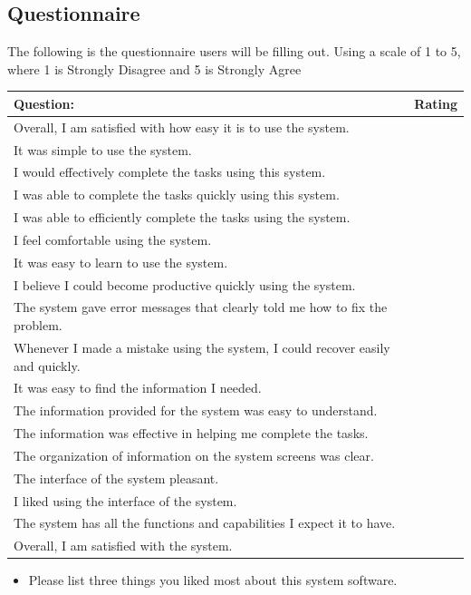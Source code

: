 \documentclass[12pt]{article}
\begin{document}
\begin{flushleft}
\newpage
\subsection{Questionnaire}
The following is the questionnaire users will be filling out.
Using a scale of 1 to 5, where 1 is Strongly Disagree and 5 is Strongly Agree

\begin{center}
\begin{tabular}{|l|p{2cm}|}
\hline
 Question: & Rating \\
\hline
	Overall, I am satisfied with how easy it is to use the system. &  \\ \hline
	It was simple to use the system. & \\ \hline
	I would effectively complete the tasks using this system. & \\ \hline
	I was able to complete the tasks quickly using this system. & \\ \hline
	I was able to efficiently complete the tasks using the system. & \\ \hline
	I feel comfortable using the system. & \\ \hline
	It was easy to learn to use the system. & \\ \hline
	I believe I could become productive quickly using the system. & \\ \hline
	The system gave error messages that clearly told me how to fix the problem. & \\ \hline
	Whenever I made a mistake using the system, I could recover easily and quickly. & \\ \hline
	It was easy to find the information I needed. & \\ \hline
	The information provided for the system was easy to understand. & \\ \hline
	The information was effective in helping me complete the tasks. & \\ \hline
	The organization of information on the system screens was clear. & \\ \hline
	The interface of the system pleasant. & \\ \hline
 I liked using the interface of the system. & \\ \hline
	The system has all the functions and capabilities I expect it to have. & \\ \hline
	Overall, I am satisfied with the system. & \\ \hline

\end{tabular}
\end{center}
\begin{itemize}
\item	Please list three things you liked most about this system software.


\end{itemize}
\end{flushleft}
\end{document}
